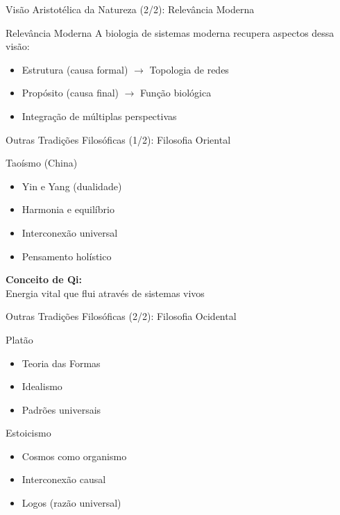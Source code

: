 \begin{frame}{Visão Aristotélica da Natureza (2/2): Relevância Moderna}
\begin{exampleblock}{Relevância Moderna}
A biologia de sistemas moderna recupera aspectos dessa visão:
\begin{itemize}
    \item Estrutura (causa formal) $\rightarrow$ Topologia de redes
    \item Propósito (causa final) $\rightarrow$ Função biológica
    \item Integração de múltiplas perspectivas
\end{itemize}
\end{exampleblock}
\end{frame}

\begin{frame}{Outras Tradições Filosóficas (1/2): Filosofia Oriental}
\begin{block}{Taoísmo (China)}
\begin{itemize}
    \item Yin e Yang (dualidade)
    \item Harmonia e equilíbrio
    \item Interconexão universal
    \item Pensamento holístico
\end{itemize}

\vspace{0.3cm}

\textbf{Conceito de Qi:}\\
Energia vital que flui através de sistemas vivos
\end{block}
\end{frame}

\begin{frame}{Outras Tradições Filosóficas (2/2): Filosofia Ocidental}
\begin{block}{Platão}
\begin{itemize}
    \item Teoria das Formas
    \item Idealismo
    \item Padrões universais
\end{itemize}
\end{block}

\vspace{0.3cm}

\begin{block}{Estoicismo}
\begin{itemize}
    \item Cosmos como organismo
    \item Interconexão causal
    \item Logos (razão universal)
\end{itemize}
\end{block}
\end{frame}

